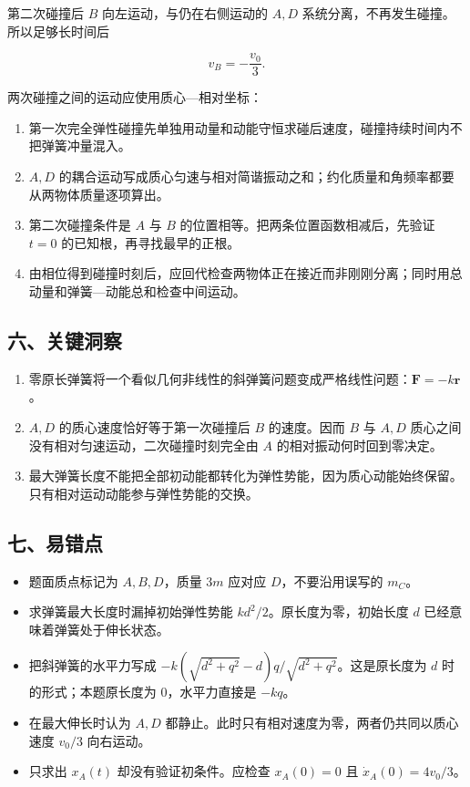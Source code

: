 \documentclass[12pt,a4paper,UTF8]{ctexart}
\newcommand{\tightlist}{\setlength{\itemsep}{0pt}\setlength{\parskip}{0pt}}
\begin{document}
第二次碰撞后 \(B\) 向左运动，与仍在右侧运动的 \(A,D\)
系统分离，不再发生碰撞。所以足够长时间后

\[
\boxed{v_B=-\frac{v_0}{3}}.
\]

两次碰撞之间的运动应使用质心---相对坐标：

\begin{enumerate}
\def\labelenumi{\arabic{enumi}.}
\tightlist
\item
  第一次完全弹性碰撞先单独用动量和动能守恒求碰后速度，碰撞持续时间内不把弹簧冲量混入。
\item
  \(A,D\)
  的耦合运动写成质心匀速与相对简谐振动之和；约化质量和角频率都要从两物体质量逐项算出。
\item
  第二次碰撞条件是 \(A\) 与 \(B\)
  的位置相等。把两条位置函数相减后，先验证 \(t=0\)
  的已知根，再寻找最早的正根。
\item
  由相位得到碰撞时刻后，应回代检查两物体正在接近而非刚刚分离；同时用总动量和弹簧---动能总和检查中间运动。
\end{enumerate}

\subsection{六、关键洞察}\label{ux516dux5173ux952eux6d1eux5bdf-3}

\begin{enumerate}
\def\labelenumi{\arabic{enumi}.}
\tightlist
\item
  零原长弹簧将一个看似几何非线性的斜弹簧问题变成严格线性问题：\(\bm F=-k\bm r\)。
\item
  \(A,D\) 的质心速度恰好等于第一次碰撞后 \(B\) 的速度。因而 \(B\) 与
  \(A,D\) 质心之间没有相对匀速运动，二次碰撞时刻完全由 \(A\)
  的相对振动何时回到零决定。
\item
  最大弹簧长度不能把全部初动能都转化为弹性势能，因为质心动能始终保留。只有相对运动动能参与弹性势能的交换。
\end{enumerate}

\subsection{七、易错点}\label{ux4e03ux6613ux9519ux70b9-3}

\begin{itemize}
\tightlist
\item
  题面质点标记为 \(A,B,D\)，质量 \(3m\) 应对应 \(D\)，不要沿用误写的
  \(m_C\)。
\item
  求弹簧最大长度时漏掉初始弹性势能 \(kd^2/2\)。原长度为零，初始长度
  \(d\) 已经意味着弹簧处于伸长状态。
\item
  把斜弹簧的水平力写成
  \(-k(\sqrt{d^2+q^2}-d)q/\sqrt{d^2+q^2}\)。这是原长度为 \(d\)
  时的形式；本题原长度为 0，水平力直接是 \(-kq\)。
\item
  在最大伸长时认为 \(A,D\)
  都静止。此时只有相对速度为零，两者仍共同以质心速度 \(v_0/3\)
  向右运动。
\item
  只求出 \(x_A(t)\) 却没有验证初条件。应检查 \(x_A(0)=0\) 且
  \(\dot x_A(0)=4v_0/3\)。
\end{itemize}
\end{document}

